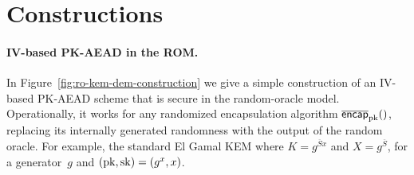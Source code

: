 \section{Constructions}
\label{sec:constructions}
\paragraph{IV-based PK-AEAD in the ROM. }
In Figure~\ref{fig:ro-kem-dem-construction} we give a simple construction of an IV-based PK-AEAD scheme that is secure  in the random-oracle model.   Operationally, it works for any randomized encapsulation algorithm $\OLencapprim{\pk}{}$, replacing its internally generated randomness with the output of the random oracle.  For example, the standard El Gamal KEM where $K=g^{\overline{S}x}$ and $X=g^{\overline{S}}$, for a generator~$g$ and $(\mathrm{pk},\mathrm{sk})=(g^x,x)$.


